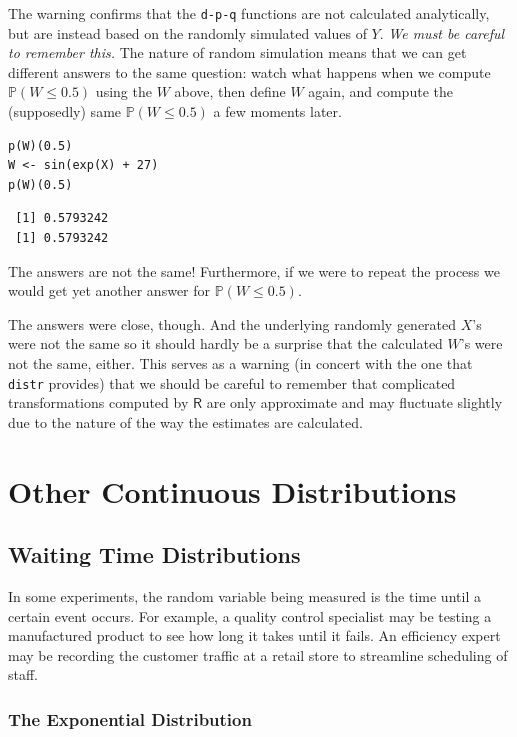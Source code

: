 \documentclass[captions=tableheading]{scrbook}
\begin{document}
The warning confirms that the \texttt{d-p-q} functions are not calculated analytically, but are instead based on the randomly simulated values of \(Y\). \emph{We must be careful to remember this.} The nature of random simulation means that we can get different answers to the same question: watch what happens when we compute \(\mathbb{P}(W\leq0.5)\) using the \(W\) above, then define \(W\) again, and compute the (supposedly) same \(\mathbb{P}(W\leq0.5)\) a few moments later.


\lstset{language=R}
\begin{lstlisting}
p(W)(0.5)
W <- sin(exp(X) + 27)
p(W)(0.5)
\end{lstlisting}

\begin{verbatim}
 [1] 0.5793242
 [1] 0.5793242
\end{verbatim}

The answers are not the same! Furthermore, if we were to repeat the process we would get yet another answer for \(\mathbb{P}(W\leq0.5)\).  

The answers were close, though. And the underlying randomly generated \(X\)'s were not the same so it should hardly be a surprise that the calculated \(W\)'s were not the same, either. This serves as a warning (in concert with the one that \texttt{distr} provides) that we should be careful to remember that complicated transformations computed by \(\mathsf{R}\) are only approximate and may fluctuate slightly due to the nature of the way the estimates are calculated.
\section{Other Continuous Distributions}
\label{sec-6-5}
\label{sec-Other-Continuous-Distributions}
\subsection{Waiting Time Distributions}
\label{sec-6-5-1}
\label{sub-Waiting-Time-Distributions}


In some experiments, the random variable being measured is the time until a certain event occurs. For example, a quality control specialist may be testing a manufactured product to see how long it takes until it fails. An efficiency expert may be recording the customer traffic at a retail store to streamline scheduling of staff. 
\subsubsection{The Exponential Distribution}
\label{sec-6-5-1-1}
\label{sub-The-Exponential-Distribution}
\end{document}
